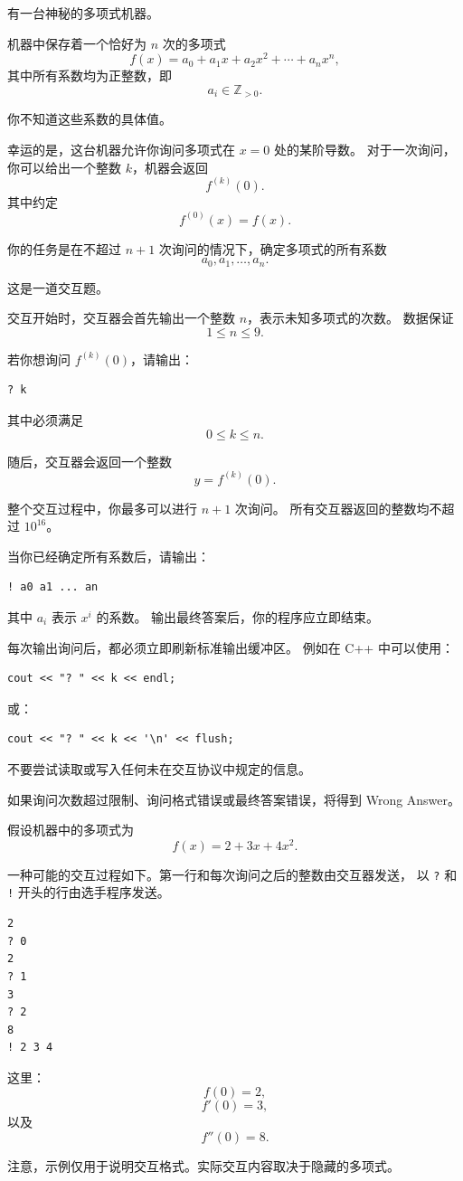 \Description

有一台神秘的多项式机器。

机器中保存着一个恰好为 $n$ 次的多项式
\[
f(x)=a_0+a_1x+a_2x^2+\cdots+a_nx^n,
\]
其中所有系数均为正整数，即
\[
a_i\in\mathbb{Z}_{>0}.
\]

你不知道这些系数的具体值。

幸运的是，这台机器允许你询问多项式在 $x=0$ 处的某阶导数。
对于一次询问，你可以给出一个整数 $k$，机器会返回
\[
f^{(k)}(0).
\]
其中约定
\[
f^{(0)}(x)=f(x).
\]

你的任务是在不超过 $n+1$ 次询问的情况下，确定多项式的所有系数
\[
a_0,a_1,\ldots,a_n.
\]

\interactor

这是一道交互题。

交互开始时，交互器会首先输出一个整数 $n$，表示未知多项式的次数。
数据保证
\[
1\le n\le 9.
\]

\InteractionQuery

若你想询问 $f^{(k)}(0)$，请输出：
\begin{verbatim}
? k
\end{verbatim}

其中必须满足
\[
0\le k\le n.
\]

随后，交互器会返回一个整数
\[
y=f^{(k)}(0).
\]

整个交互过程中，你最多可以进行 $n+1$ 次询问。
所有交互器返回的整数均不超过 $10^{16}$。

\InteractionAnswer

当你已经确定所有系数后，请输出：
\begin{verbatim}
! a0 a1 ... an
\end{verbatim}

其中 $a_i$ 表示 $x^i$ 的系数。
输出最终答案后，你的程序应立即结束。

\InteractionNotes

每次输出询问后，都必须立即刷新标准输出缓冲区。
例如在 C++ 中可以使用：
\begin{verbatim}
cout << "? " << k << endl;
\end{verbatim}

或：
\begin{verbatim}
cout << "? " << k << '\n' << flush;
\end{verbatim}

不要尝试读取或写入任何未在交互协议中规定的信息。

如果询问次数超过限制、询问格式错误或最终答案错误，将得到 Wrong Answer。

\InteractionExample

假设机器中的多项式为
\[
f(x)=2+3x+4x^2.
\]

一种可能的交互过程如下。第一行和每次询问之后的整数由交互器发送，
以 \texttt{?} 和 \texttt{!} 开头的行由选手程序发送。
\begin{verbatim}
2
? 0
2
? 1
3
? 2
8
! 2 3 4
\end{verbatim}

这里：
\[
f(0)=2,
\]
\[
f'(0)=3,
\]
以及
\[
f''(0)=8.
\]

注意，示例仅用于说明交互格式。实际交互内容取决于隐藏的多项式。
